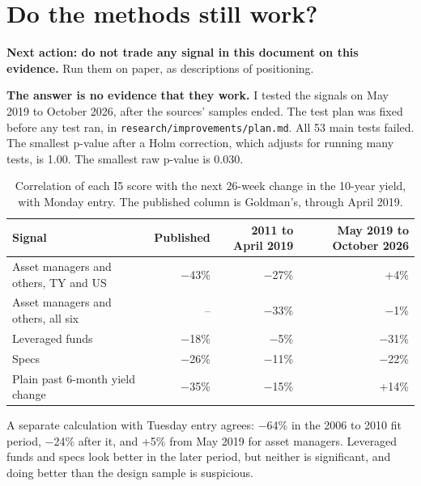 \documentclass[11pt,a4paper]{article}
\newcommand{\code}[1]{\nolinkurl{#1}}
\begin{document}
\section{Do the methods still work?}\label{sec:improve}

\textbf{Next action: do not trade any signal in this document on this evidence.} Run them on paper, as descriptions of positioning.

\textbf{The answer is no evidence that they work.} I tested the signals on May 2019 to October 2026, after the sources' samples ended. The test plan was fixed before any test ran, in \code{research/improvements/plan.md}. All 53 main tests failed. The smallest p-value after a Holm correction, which adjusts for running many tests, is 1.00. The smallest raw p-value is 0.030.

\begin{table}[ht]
\centering\small
\caption{Correlation of each I5 score with the next 26-week change in the 10-year yield, with Monday entry. The published column is Goldman's, through April 2019.}\label{tab:oos}
\begin{tabular}{@{}lrrr@{}}
\toprule
Signal & Published & 2011 to April 2019 & May 2019 to October 2026 \\
\midrule
Asset managers and others, TY and US & $-$43\% & $-$27\% & +4\% \\
Asset managers and others, all six & -- & $-$33\% & $-$1\% \\
Leveraged funds & $-$18\% & $-$5\% & $-$31\% \\
Specs & $-$26\% & $-$11\% & $-$22\% \\
Plain past 6-month yield change & $-$35\% & $-$15\% & +14\% \\
\bottomrule
\end{tabular}
\end{table}

A separate calculation with Tuesday entry agrees: $-$64\% in the 2006 to 2010 fit period, $-$24\% after it, and +5\% from May 2019 for asset managers. Leveraged funds and specs look better in the later period, but neither is significant, and doing better than the design sample is suspicious.
\end{document}
